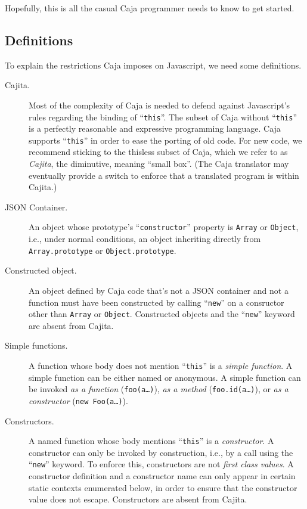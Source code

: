 \documentclass[letterpaper,twocolumn,10pt]{article}
\newcommand{\code}[1]{{\tt {#1}}}              %
\begin{document}
Hopefully, this is all the casual Caja programmer needs to know to get
started.

\subsection{Definitions}

To explain the restrictions Caja imposes on Javascript, we need some
definitions. 

\begin{description}

  \item[Cajita.] Most of the complexity of Caja is needed to defend 
  against Javascript's rules regarding the binding of ``\code{this}''. The 
  subset of Caja without ``\code{this}'' is a perfectly reasonable and 
  expressive programming language. Caja supports ``\code{this}'' in order to 
  ease the porting of old code. For new code, we recommend sticking to the
  thisless subset of Caja, which we refer to as \emph{Cajita}, the diminutive,
  meaning ``small box''. (The Caja translator may eventually provide
  a switch to enforce that a translated program is within Cajita.)

  \item[JSON Container.] An object whose prototype's ``\code{constructor}'' 
  property is \code{Array} or \code{Object}, i.e., under normal conditions, 
  an object inheriting directly from \code{Array.prototype} or 
  \code{Object.prototype}.

  \item[Constructed object.] An object defined by Caja code that's not a 
  JSON container and not a function must have been constructed by calling 
  ``\code{new}'' on a consructor other than \code{Array} or \code{Object}. 
  Constructed objects and the ``\code{new}'' keyword are absent from Cajita.

  \item[Simple functions.] A function whose body does not mention 
  ``\code{this}'' is a \emph{simple function}. A simple function can be 
  either named or anonymous. A simple function can be invoked \emph{as a 
  function} (\code{foo(a\ldots)}), \emph{as a method} 
  (\code{foo.id(a\ldots)}), or \emph{as a constructor} (\code{new 
  Foo(a\ldots)}).
    
  \item[Constructors.] A named function whose body mentions ``\code{this}'' 
  is a \emph{constructor}. A constructor can only be invoked by construction, 
  i.e., by a call using the ``\code{new}'' keyword. To enforce this, 
  constructors are not \emph{first class values}. A constructor definition 
  and a constructor name can only appear in certain static contexts 
  enumerated below, in order to ensure that the constructor value does not 
  escape. Constructors are absent from Cajita.
    

\end{description}
\end{document}
